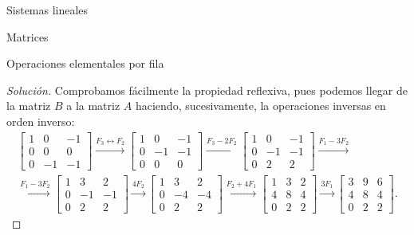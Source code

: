 \documentclass[a4paper,12pt,twoside,spanish,reqno]{amsbook}
\numberwithin{equation}{section}
\theoremstyle{definition}
\theoremstyle{remark}
\begin{document}
\begin{chapter}{Sistemas lineales}
\begin{section}{Matrices}
\begin{subsection}{Operaciones elementales por fila}
\begin{proof}[Solución]
                    Comprobamos fácilmente la propiedad reflexiva, pues podemos llegar de la matriz $B$ a la matriz $A$ haciendo, sucesivamente, la operaciones inversas en orden inverso:
                    \begin{multline*}
                    \begin{bmatrix}1 & 0& -1 \\ 0&0&0\\  0&-1&-1 \end{bmatrix}
                    \stackrel{F_3\leftrightarrow F_2}{\longrightarrow} 
                    \begin{bmatrix}1 & 0& -1 \\ 0&-1&-1 \\ 0&0&0 \end{bmatrix}
                    \stackrel{F_3 - 2F_2}{\longrightarrow} 
                    \begin{bmatrix}1 & 0& -1 \\ 0&-1&-1 \\ 0&2&2 \end{bmatrix} 
                    \stackrel{F_1 - 3F_2}{\longrightarrow}
                    \\ \stackrel{F_1 - 3F_2}{\longrightarrow}
                    \begin{bmatrix}1 & 3 & 2 \\ 0&-1&-1 \\ 0&2&2 \end{bmatrix}
                    \stackrel{4F_2}{\longrightarrow} 
                    \begin{bmatrix}1 & 3 & 2 \\ 0&-4&-4 \\ 0&2&2 \end{bmatrix} 
                    \stackrel{F_2 +4F_1}{\longrightarrow} 
                    \begin{bmatrix} 1 & 3 & 2 \\ 4&8&4 \\ 0&2&2\end{bmatrix} 
                    \stackrel{3F_1}{\longrightarrow} 
                    \begin{bmatrix} 3 & 9 & 6 \\ 4&8&4 \\ 0&2&2 \end{bmatrix}.
                    \end{multline*}
                \end{proof}
                

\end{subsection}
\end{section}
\end{chapter}
\end{document}
